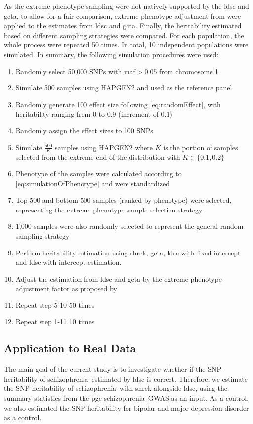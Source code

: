 \documentclass[12pt]{scrbook}
\newcommand*{\scz}{schizophrenia}
\begin{document}
As the extreme phenotype sampling were not natively supported by the \gls{ldsc} and \gls{gcta}, to allow for a fair comparison, extreme phenotype adjustment from \citet{Sham2014} were applied to the estimates from \gls{ldsc} and \gls{gcta}.
Finally, the heritability estimated based on different sampling strategies were compared.
For each population, the whole process were repeated 50 times. 
In total, 10 independent populations were simulated. 
In summary, the following simulation procedures were used:
\begin{enumerate}
	\item Randomly select 50,000 \glspl{SNP} with \gls{maf}$>0.05$ from chromosome 1
	\item Simulate 500 samples using HAPGEN2 and used as the reference panel
	\item Randomly generate 100 effect size following \cref{eq:randomEffect}, with heritability ranging from 0 to 0.9 (increment of 0.1)
	\item Randomly assign the effect sizes to 100 \glspl{SNP}
	\item Simulate $\frac{500}{K}$ samples using HAPGEN2 where $K$ is the portion of samples selected from the extreme end of the distribution with $K\in\{0.1,0.2\}$
	\item Phenotype of the samples were calculated according to \cref{eq:simulationOfPhenotype} and were standardized
	\item Top 500 and bottom 500 samples (ranked by phenotype) were selected, representing the extreme phenotype sample selection strategy
	\item 1,000 samples were also randomly selected to represent the general random sampling strategy
	\item Perform heritability estimation using \gls{shrek}, \gls{gcta}, \gls{ldsc} with fixed intercept and \gls{ldsc} with intercept estimation.
	\item Adjust the estimation from \gls{ldsc} and \gls{gcta} by the extreme phenotype adjustment factor as proposed by \citet{Sham2014}
	\item Repeat step 5-10 50 times
	\item Repeat step 1-11 10 times
\end{enumerate}

\subsection{Application to Real Data}
\label{sec:realData}
The main goal of the current study is to investigate whether if the \gls{SNP}-heritability of \scz\ estimated by \gls{ldsc} is correct.
Therefore, we estimate the \gls{SNP}-heritability of \scz\ with \gls{shrek} alongside \gls{ldsc}, using the summary statistics from the \gls{pgc} \scz\ \gls{GWAS} \citep{Ripke2014} as an input. 
As a control, we also estimated the \gls{SNP}-heritability for bipolar and major depression disorder \citep{sklar2011large,Ripke2013b} as a control.
\end{document}

